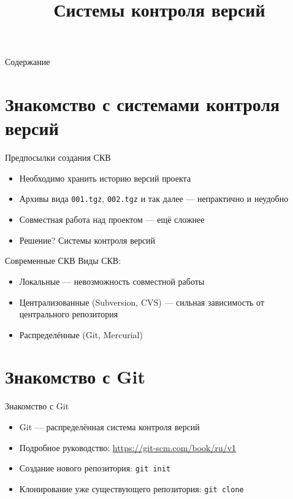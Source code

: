 \documentclass[handout]{beamer}
\title{Системы контроля версий}
\date{}
\begin{document}
\begin{frame}
	\maketitle
\end{frame}

\begin{frame}{Содержание}
	\tableofcontents
\end{frame}

\section{Знакомство с системами контроля версий}

\begin{frame}{Предпосылки создания СКВ}
	\begin{itemize}
		\item{Необходимо хранить историю версий проекта}\pause
		\item{Архивы вида \texttt{001.tgz}, \texttt{002.tgz} и так далее --- непрактично и неудобно}\pause
		\item{Совместная работа над проектом --- ещё сложнее}\pause
		\item{Решение? Системы контроля версий}
	\end{itemize}	
\end{frame}

\begin{frame}{Современные СКВ}
	Виды СКВ:\pause
	\begin{itemize}
		\item{Локальные --- невозможность совместной работы}\pause
		\item{Централизованные (Subversion, CVS) --- сильная зависимость от центрального репозитория}\pause
		\item{Распределённые (Git, Mercurial)}
	\end{itemize}
\end{frame}

\section{Знакомство с Git}

\begin{frame}{Знакомство с Git}
	\begin{itemize}
		\item{Git --- распределённая система контроля версий}\pause
		\item{Подробное руководство: {\color{blue} \url{https://git-scm.com/book/ru/v1}}}\pause
		\item{Создание нового репозитория: \texttt{git~init}}\pause
		\item{Клонирование уже существующего репозитория: \texttt{git~clone}}
	\end{itemize}
\end{frame}
\end{document}
